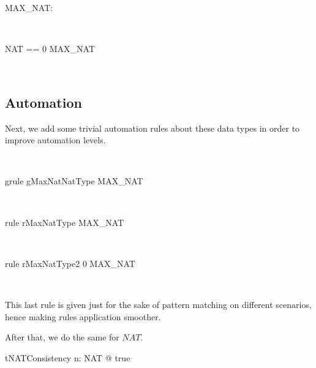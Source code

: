 \begin{LNewADef}
\begin{axdef}
   MAX\_NAT: \nat
\end{axdef}~\end{LNewADef}
%
\begin{LNewADef}
\begin{zed}
    NAT == 0 \upto MAX\_NAT
\end{zed}~\end{LNewADef}

\subsection*{Automation}

Next, we add some trivial automation rules about these data types
in order to improve automation levels.
%
\begin{LGRT}
~\end{LGRT}
%
\begin{LGRT}
\begin{theorem}{grule gMaxNatNatType}
    MAX\_NAT \in  \nat
\end{theorem}~\end{LGRT}
%
\begin{LRRT}
\begin{theorem}{rule rMaxNatType}
    MAX\_NAT 
\end{theorem}~\end{LRRT}
%
\begin{LRRT}
\begin{theorem}{rule rMaxNatType2}
    0 \leq  MAX\_NAT
\end{theorem}~\end{LRRT}
%
This last rule is given just for the sake of
pattern matching on different scenarios, hence
making rules application smoother.

After that, we do the same for $NAT$.
%
\begin{LNewThm}
\begin{theorem}{tNATConsistency}
    \exists  n: NAT @ true
\end{theorem}~\end{LNewThm}
%

\begin{LRRT}
~\end{LRRT}

